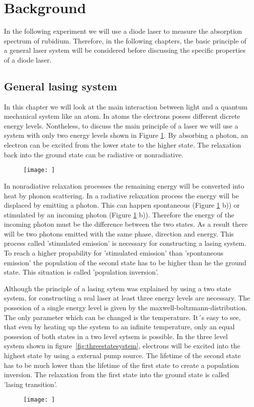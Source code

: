 \section{Background}

In the following experiment we will use a diode laser to measure the absorption
spectrum of rubidium. Therefore, in the following chapters, the basic principle
of a general laser system will be considered before discussing the specific
properties of a diode laser.

\subsection{General lasing system}

In this chapter we will look at the main interaction between light and a
quantum mechanical system like an atom. In atoms the electrons posess different
dicrete energy levels. Nontheless, to discuss the main principle of a laser
we will use a system with only two energy levels shown in Figure \ref{fig:twolevelsystem}.
By absorbing a photon, an electron can be excited from the lower state to the
higher state. The relaxation back into the ground state can be radiative or
nonradiative.
\begin{figure}
  \texttt{[image: ]}
  \caption{}
  \label{fig:twolevelsystem}
\end{figure}
In nonradiative relaxation processes the remaining energy will be converted into
heat by phonon scattering. In a radiative relaxation process the energy will
be displaced by emitting a photon. This can happen spontaneous (Figure \ref{fig:twolevelsystem} b))
or stimulated by an incoming photon (Figure \ref{fig:twolevelsystem} b)).
Therefore the energy of the incoming photon must be the difference between the
two states. As a result there will be two photons emitted with the same phase,
direction and energy. This process called 'stimulated emission' is necessary
for constructing a lasing system. To reach a higher propability for 'stimulated emission'
than 'spontaneous emission' the population of the second state has to be higher
than he the ground state. This situation is called 'population inversion'.

Although the principle of a lasing sytem was explained by using a two state system,
for constructing a real laser at least three energy levels are necessary. The possesion
of a single energy level is given by the maxwell-boltzmann-distribution. The only
parameter which can be changed is the temperature. It´s easy to see, that even
by heating up the system to an infinite temperature, only an equal possesion
of both states in a two level sytsem is possible. In the three level system
shown in figure~\ref{fig:threestatesystem},
electrons will be excited into the highest state by using a external pump source.
The lifetime of the second state has to be much lower than the lifetime of the
first state to create a population inversion. The relaxation from the first state
into the ground state is called 'lasing transition'.
\begin{figure}
  \texttt{[image: ]}
  \caption{}
  \label{threestatesystem}
\end{figure}

